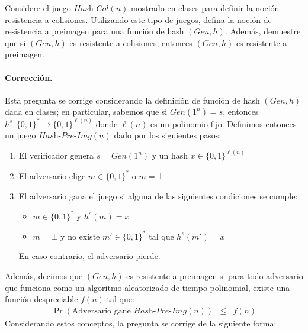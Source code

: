 


Considere el juego $\textit{Hash-Col}(n)$ mostrado en clases para definir la noción resistencia a colisiones. Utilizando este tipo de juegos, defina la noción de resistencia a preimagen para una función de hash $(\textit{Gen}, h)$. Además, demuestre que si $(\textit{Gen}, h)$ es resistente a colisiones, entonces $(\textit{Gen}, h)$ es resistente a preimagen.

\medskip

\paragraph{Corrección.}
Esta pregunta se corrige considerando la definición de función de hash
$(\textit{Gen},h)$ dada en clases; en particular, sabemos que si
$\textit{Gen}(1^n) = s$, entonces $h^s
: \{0,1\}^* \to \{0,1\}^{\ell(n)}$ donde $\ell(n)$ es un polinomio
fijo. Definimos entonces un  juego $\textit{Hash-Pre-Img}(n)$ dado por los siguientes pasos:
\begin{enumerate}
\item El verificador genera $s = \textit{Gen}(1^n)$ y un hash $x \in \{0,1\}^{\ell(n)}$
\item El adversario elige $m \in \{0,1\}^*$ o $m = \bot$
\item El adversario gana el juego si alguna de las siguientes condiciones se cumple:
\begin{itemize}
\item $m \in \{0,1\}^{*}$ y $h^s(m) = x$ 
\item $m = \bot$ y  no existe $m' \in \{0,1\}^*$ tal que $h^s(m') = x$
\end{itemize}
En caso contrario, el adversario pierde.
\end{enumerate}
Además, decimos que $(\textit{Gen},h)$ es resistente a preimagen si
para todo adversario que funciona como un algoritmo aleatorizado de
tiempo polinomial, existe una función despreciable $f(n)$ tal que:
\begin{eqnarray*}
\Pr(\text{Adversario gane } \textit{Hash-Pre-Img}(n)) &\leq& f(n)
\end{eqnarray*}
Considerando estos conceptos, la pregunta se corrige de la siguiente forma:
